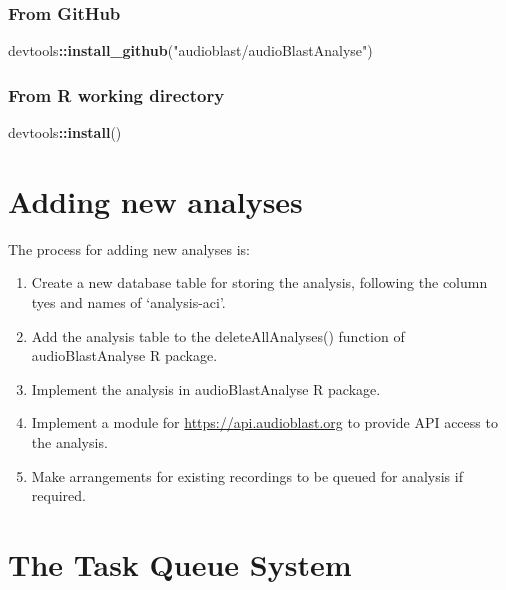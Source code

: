 \documentclass[
]{book}
\newenvironment{Shaded}{\begin{snugshade}}{\end{snugshade}}
\newcommand{\FunctionTok}[1]{\textcolor[rgb]{0.13,0.29,0.53}{\textbf{#1}}}
\newcommand{\NormalTok}[1]{#1}
\newcommand{\SpecialCharTok}[1]{\textcolor[rgb]{0.81,0.36,0.00}{\textbf{#1}}}
\newcommand{\StringTok}[1]{\textcolor[rgb]{0.31,0.60,0.02}{#1}}
\begin{document}
\hypertarget{from-github}{%
\subsection{From GitHub}\label{from-github}}

\begin{Shaded}
\begin{Highlighting}[]
\NormalTok{devtools}\SpecialCharTok{::}\FunctionTok{install\_github}\NormalTok{(}\StringTok{"audioblast/audioBlastAnalyse"}\NormalTok{)}
\end{Highlighting}
\end{Shaded}

\hypertarget{from-r-working-directory}{%
\subsection{From R working directory}\label{from-r-working-directory}}

\begin{Shaded}
\begin{Highlighting}[]
\NormalTok{devtools}\SpecialCharTok{::}\FunctionTok{install}\NormalTok{()}
\end{Highlighting}
\end{Shaded}

\hypertarget{adding-new-analyses}{%
\chapter{Adding new analyses}\label{adding-new-analyses}}

The process for adding new analyses is:

\begin{enumerate}
\def\labelenumi{\arabic{enumi}.}
\item
  Create a new database table for storing the analysis, following the column tyes and names of `analysis-aci'.
\item
  Add the analysis table to the deleteAllAnalyses() function of audioBlastAnalyse R package.
\item
  Implement the analysis in audioBlastAnalyse R package.
\item
  Implement a module for \url{https://api.audioblast.org} to provide API access to the analysis.
\item
  Make arrangements for existing recordings to be queued for analysis if required.
\end{enumerate}

\hypertarget{the-task-queue-system}{%
\chapter{The Task Queue System}\label{the-task-queue-system}}
\end{document}
